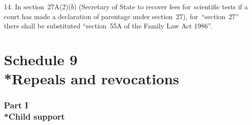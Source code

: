 \documentclass[12pt,a4paper]{article}
\begin{document}
\medskip

14. In section~27A(2)($b$)  (Secretary of State to recover fees for~scientific tests if a court has made a declaration of parentage under section~27), for~“section~27” there shall be substituted “section~55A of the Family Law Act 1986”.

%


\part[Schedule 9 --- Repeals and revocations]{Schedule 9\\*Repeals and revocations}

\renewcommand\parthead{--- Schedule 9}

\section[Part I --- Child support]{Part I\\*Child support}

\renewcommand\parthead{--- Schedule 9 Part I}
\end{document}
